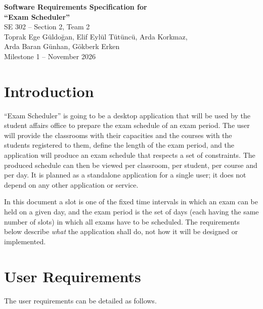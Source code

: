 \documentclass[11pt,a4paper]{article}
\begin{document}
\begin{center}
{\LARGE\bfseries Software Requirements Specification for\\[2pt] ``Exam Scheduler''}\\[10pt]
SE 302 -- Section 2, Team 2\\
Toprak Ege Güldoğan, Elif Eylül Tütüncü, Arda Korkmaz,\\
Arda Baran Günhan, Gökberk Erken\\
Milestone 1 -- November 2026
\end{center}
\section{Introduction}
``Exam Scheduler'' is going to be a desktop application that will be used by the student affairs office to prepare the exam schedule of an exam period. The user will provide the classrooms with their capacities and the courses with the students registered to them, define the length of the exam period, and the application will produce an exam schedule that respects a set of constraints. The produced schedule can then be viewed per classroom, per student, per course and per day. It is planned as a standalone application for a single user; it does not depend on any other application or service.

In this document a slot is one of the fixed time intervals in which an exam can be held on a given day, and the exam period is the set of days (each having the same number of slots) in which all exams have to be scheduled. The requirements below describe \emph{what} the application shall do, not how it will be designed or implemented.

\section{User Requirements}
The user requirements can be detailed as follows.
\end{document}
